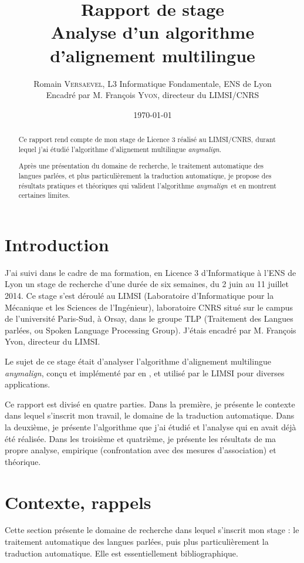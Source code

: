 \documentclass[a4paper,10pt]{article}
\title{ \Large Rapport de stage \\ \LARGE Analyse d'un algorithme d'alignement multilingue}
\author{\normalsize Romain \textsc{Versaevel}, L3 Informatique Fondamentale, ENS de Lyon \\ \normalsize Encadré par M. François \textsc{Yvon}, directeur du LIMSI/CNRS \\}
\date{\today}
\newcommand{\anym}{\emph{anymalign}}
\begin{document}
\maketitle

\begin{abstract}
Ce rapport rend compte de mon stage de Licence 3 réalisé au LIMSI/CNRS, durant lequel j'ai étudié l'algorithme d'alignement multilingue \anym .

Après une présentation du domaine de recherche, le traitement automatique des langues parlées, et plus particulièrement la traduction automatique, je propose des résultats pratiques et théoriques qui valident l'algorithme \anym~et en montrent certaines limites. %
\end{abstract}

\newpage
\tableofcontents
\newpage

\section{Introduction}
J'ai suivi dans le cadre de ma formation, en Licence 3 d'Informatique à l'ENS de Lyon un stage de recherche d'une durée de six semaines, du 2 juin au 11 juillet 2014. Ce stage s'est déroulé au LIMSI (Laboratoire d'Informatique pour la Mécanique et les Sciences de l'Ingénieur), laboratoire CNRS situé sur le campus de l'université Paris-Sud, à Orsay, dans le groupe TLP (Traitement des Langues parlées, ou Spoken Language Processing Group). J'étais encadré par M. François Yvon, directeur du LIMSI.

Le sujet de ce stage était d'analyser l'algorithme d'alignement multilingue \anym, conçu et implémenté par
en
, et utilisé par le LIMSI pour diverses applications. %

Ce rapport est divisé en quatre parties. Dans la première, je présente le contexte dans lequel s'inscrit mon travail, le domaine de la traduction automatique. Dans la deuxième, je présente l'algorithme que j'ai étudié et l'analyse qui en avait déjà été réalisée. Dans les troisième et quatrième, je présente les résultats de ma propre analyse, empirique (confrontation avec des mesures d'association) et théorique.



\section{Contexte, rappels}

Cette section présente le domaine de recherche dans lequel s'inscrit mon stage : le traitement automatique des langues parlées, puis plus particulièrement la traduction automatique. Elle est essentiellement bibliographique.
\end{document}
